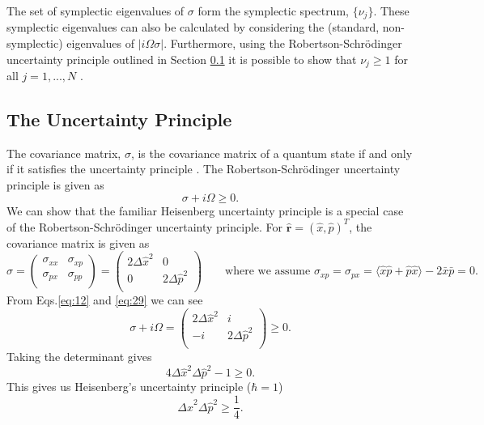 \documentclass[11pt,a4paper]{article}
\numberwithin{equation}{section}
\begin{document}
	The set of symplectic eigenvalues of $\sigma$ form the symplectic spectrum, $\{\nu_j\}$. These symplectic eigenvalues can also be calculated by considering the (standard, non-symplectic) eigenvalues of $\lvert i\Omega \sigma \lvert$. Furthermore, using the Robertson-Schr{\"o}dinger uncertainty principle outlined in Section \ref{sec:uncertainty} it is possible to show that $\nu_j\geq 1$ for all $j = 1, ..., N$ \cite{Serafini05}.
	
	\subsection{The Uncertainty Principle}
	\label{sec:uncertainty}
	The covariance matrix, $\sigma$, is the covariance matrix of a quantum state if and only if it satisfies the uncertainty principle \cite{Simon94}. The Robertson-Schr{\"o}dinger uncertainty principle is given as \cite{Rob29, Sch30}
	\begin{equation} \label{eq:29}
	\sigma + i\Omega \geq 0.
	\end{equation} 
	We can show that the familiar Heisenberg uncertainty principle is a special case of the Robertson-Schr{\"o}dinger uncertainty principle. For $\mathbf{\hat{r}} = (\hat{x}, \hat{p})^T$, the covariance matrix is given as
	\begin{equation*}
	\sigma = 
	\begin{pmatrix}
	\sigma_{xx} & \sigma_{xp}  \\
	\sigma_{px} & \sigma_{pp} \\
	\end{pmatrix}
	= 
	\begin{pmatrix}
	2\Delta\hat{x}^2 & 0  \\
	0 & 2\Delta\hat{p}^2 \\
	\end{pmatrix} \qquad\text{where we assume $\sigma_{xp}=\sigma_{px}= \langle \hat{x}\hat{p} + \hat{p}\hat{x} \rangle - 2\bar{x}\bar{p} = 0$}.
	\end{equation*}
	From Eqs.\ref{eq:12} and \ref{eq:29} we can see
	\begin{equation*}
	\sigma + i\Omega = 
	\begin{pmatrix}
	2\Delta\hat{x}^2 & i  \\
	-i & 2\Delta\hat{p}^2 \\
	\end{pmatrix} \geq 0.
	\end{equation*}
	Taking the determinant gives
	\begin{equation*}
	4\Delta\hat{x}^{2}\Delta\hat{p}^2 - 1 \geq 0.
	\end{equation*}  
	This gives us Heisenberg's uncertainty principle ($\hbar = 1$) \cite{Heisenberg27} 
	\begin{equation*}
	\Delta\hat{x}^{2}\Delta\hat{p}^2 \geq \frac{1}{4} .
	\end{equation*}
	
\end{document}
